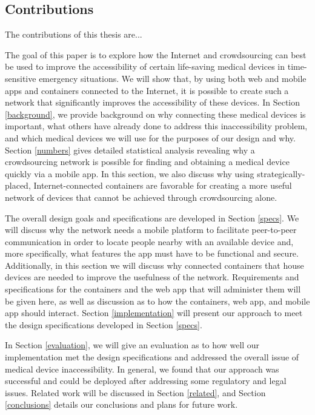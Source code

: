 \subsection{Contributions}

The contributions of this thesis are...

The goal of this paper is to explore how the Internet and crowdsourcing can best be used to improve the accessibility of certain life-saving medical devices in time-sensitive emergency situations. We will show that, by using both web and mobile apps and containers connected to the Internet, it is possible to create such a network that significantly improves the accessibility of these devices. In Section \ref{background}, we provide background on why connecting these medical devices is important, what others have already done to address this inaccessibility problem, and which medical devices we will use for the purposes of our design and why. Section \ref{numbers} gives detailed statistical analysis revealing why a crowdsourcing network is possible for finding and obtaining a medical device quickly via a mobile app. In this section, we also discuss why using strategically-placed, Internet-connected containers are favorable for creating a more useful network of devices that cannot be achieved through crowdsourcing alone.

The overall design goals and specifications are developed in Section \ref{specs}. We will discuss why the network needs a mobile platform to facilitate peer-to-peer communication in order to locate people nearby with an available device and, more specifically, what features the app must have to be functional and secure. Additionally, in this section we will discuss why connected containers that house devices are needed to improve the usefulness of the network. Requirements and specifications for the containers and the web app that will administer them will be given here, as well as discussion as to how the containers, web app, and mobile app should interact. Section \ref{implementation} will present our approach to meet the design specifications developed in Section \ref{specs}.

In Section \ref{evaluation}, we will give an evaluation as to how well our implementation met the design specifications and addressed the overall issue of medical device inaccessibility. In general, we found that our approach was successful and could be deployed after addressing some regulatory and legal issues. Related work will be discussed in Section \ref{related}, and Section \ref{conclusions} details our conclusions and plans for future work. 


